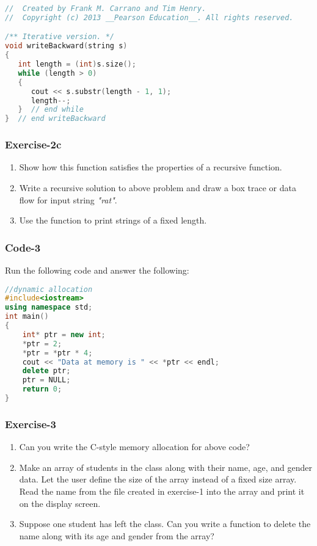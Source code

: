 \documentclass{article}
\begin{document}
\begin{lstlisting}[language=C++]
//  Created by Frank M. Carrano and Tim Henry.
//  Copyright (c) 2013 __Pearson Education__. All rights reserved.

/** Iterative version. */
void writeBackward(string s)
{
   int length = (int)s.size();
   while (length > 0)
   {
      cout << s.substr(length - 1, 1);
      length--;
   }  // end while
}  // end writeBackward
\end{lstlisting}

\subsubsection*{Exercise-2c}
\begin{enumerate}
\item Show how this function satisfies the properties of a recursive function.
\item Write a recursive solution to above problem and draw a box trace or data flow for input string \textit{"rat"}.
\item Use the function to print strings of a fixed length.
\end{enumerate}

\subsubsection*{Code-3}
Run the following code and answer the following:

\begin{lstlisting}[language=C++]
//dynamic allocation
#include<iostream>
using namespace std;
int main()
{
	int* ptr = new int;
	*ptr = 2;
	*ptr = *ptr * 4;
	cout << "Data at memory is " << *ptr << endl;
	delete ptr;
	ptr = NULL;
	return 0;
}
\end{lstlisting}

\subsubsection*{Exercise-3}
\begin{enumerate}
\item Can you write the C-style memory allocation for above code?
\item Make an array of students in the class along with their name, age, and gender data. Let the user define the size of the array instead of a fixed size array. Read the name from the file created in exercise-1 into the array and print it on the display screen.
\item Suppose one student has left the class. Can you write a function to delete the name along with its age and gender from the array?
\end{enumerate}
\end{document}
